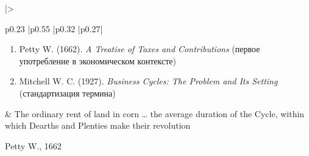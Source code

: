 \begin{longtable}{
    |>{\raggedright\arraybackslash}p{0.23\textwidth}
    |p{0.55\textwidth}
    |p{0.32\textwidth}
    |p{0.27\textwidth}|
    }
\begin{minipage}[t]{\linewidth}
\begin{enumerate}
        \item Petty W. (1662). \textit{A Treatise of Taxes and Contributions}\cite{Petty-1662} (первое употребление в экономическом контексте)
        \item Mitchell W. C. (1927). \textit{Business Cycles: The Problem and Its Setting}\cite{Mitchell-1927} (стандартизация термина)
    \end{enumerate}
\end{minipage}
&
\textquotedbl{}The ordinary rent of land in corn … the average duration of the Cycle, within which Dearths and Plenties make their revolution\textquotedbl{}
\begin{flushright}
    Petty W., 1662\cite{Petty-1662}
\end{flushright}
\\ \hline


\end{longtable}
